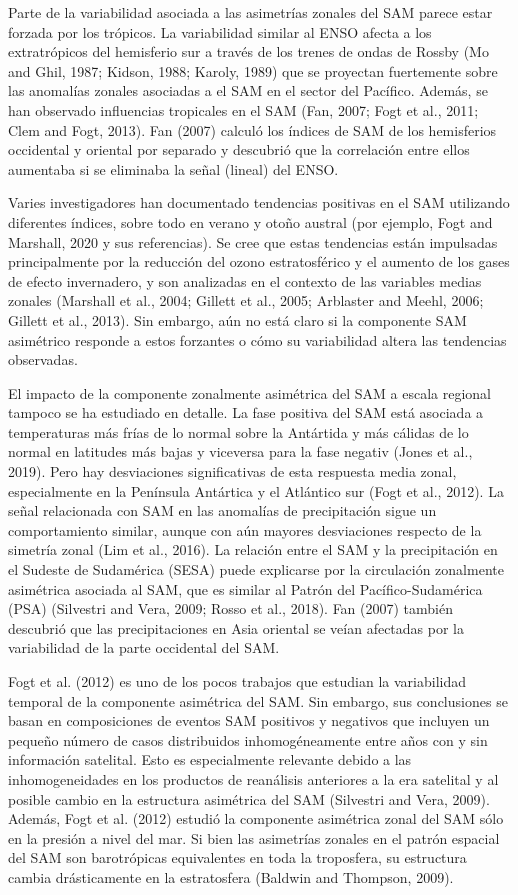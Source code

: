 \documentclass[12pt,oneside]{reedthesis}
\begin{document}
Parte de la variabilidad asociada a las asimetrías zonales del SAM parece estar forzada por los trópicos.
La variabilidad similar al ENSO afecta a los extratrópicos del hemisferio sur a través de los trenes de ondas de Rossby (Mo and Ghil, 1987; Kidson, 1988; Karoly, 1989) que se proyectan fuertemente sobre las anomalías zonales asociadas a el SAM en el sector del Pacífico.
Además, se han observado influencias tropicales en el SAM (Fan, 2007; Fogt et al., 2011; Clem and Fogt, 2013).
Fan (2007) calculó los índices de SAM de los hemisferios occidental y oriental por separado y descubrió que la correlación entre ellos aumentaba si se eliminaba la señal (lineal) del ENSO.

Varies investigadores han documentado tendencias positivas en el SAM utilizando diferentes índices, sobre todo en verano y otoño austral (por ejemplo, Fogt and Marshall, 2020 y sus referencias).
Se cree que estas tendencias están impulsadas principalmente por la reducción del ozono estratosférico y el aumento de los gases de efecto invernadero, y son analizadas en el contexto de las variables medias zonales (Marshall et al., 2004; Gillett et al., 2005; Arblaster and Meehl, 2006; Gillett et al., 2013).
Sin embargo, aún no está claro si la componente SAM asimétrico responde a estos forzantes o cómo su variabilidad altera las tendencias observadas.

El impacto de la componente zonalmente asimétrica del SAM a escala regional tampoco se ha estudiado en detalle.
La fase positiva del SAM está asociada a temperaturas más frías de lo normal sobre la Antártida y más cálidas de lo normal en latitudes más bajas y viceversa para la fase negativ (Jones et al., 2019).
Pero hay desviaciones significativas de esta respuesta media zonal, especialmente en la Península Antártica y el Atlántico sur (Fogt et al., 2012).
La señal relacionada con SAM en las anomalías de precipitación sigue un comportamiento similar, aunque con aún mayores desviaciones respecto de la simetría zonal (Lim et al., 2016).
La relación entre el SAM y la precipitación en el Sudeste de Sudamérica (SESA) puede explicarse por la circulación zonalmente asimétrica asociada al SAM, que es similar al Patrón del Pacífico-Sudamérica (PSA) (Silvestri and Vera, 2009; Rosso et al., 2018).
Fan (2007) también descubrió que las precipitaciones en Asia oriental se veían afectadas por la variabilidad de la parte occidental del SAM.

Fogt et al. (2012) es uno de los pocos trabajos que estudian la variabilidad temporal de la componente asimétrica del SAM.
Sin embargo, sus conclusiones se basan en composiciones de eventos SAM positivos y negativos que incluyen un pequeño número de casos distribuidos inhomogéneamente entre años con y sin información satelital.
Esto es especialmente relevante debido a las inhomogeneidades en los productos de reanálisis anteriores a la era satelital y al posible cambio en la estructura asimétrica del SAM (Silvestri and Vera, 2009).
Además, Fogt et al. (2012) estudió la componente asimétrica zonal del SAM sólo en la presión a nivel del mar.
Si bien las asimetrías zonales en el patrón espacial del SAM son barotrópicas equivalentes en toda la troposfera, su estructura cambia drásticamente en la estratosfera (Baldwin and Thompson, 2009).
\end{document}
